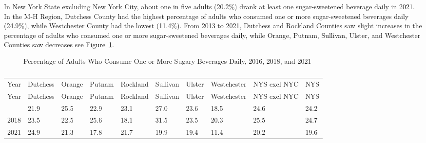 \documentclass[
  english,
  letterpaper,
]{report}
\begin{document}
In New York State excluding New York City, about one in five adults
(20.2\%) drank at least one sugar-sweetened beverage daily in 2021. In
the M-H Region, Dutchess County had the highest percentage of adults who
consumed one or more sugar-sweetened beverages daily (24.9\%), while
Westchester County had the lowest (11.4\%). From 2013 to 2021, Dutchess
and Rockland Counties saw slight increases in the percentage of adults
who consumed one or more sugar-sweetened beverages daily, while Orange,
Putnam, Sullivan, Ulster, and Westchester Counties saw decreases see
Figure~\ref{fig-brfss-sug-bev}.

\begin{figure}


\caption{\label{fig-brfss-sug-bev}Percentage of Adults Who Consume One
or More Sugary Beverages Daily, 2016, 2018, and 2021}

\end{figure}%

\begin{longtable}[]{@{}llllllllll@{}}

\caption{\label{tbl-brfss-adult-sug-bev}Percentage of Adults Who Consume
One or More Sugary Beverages Daily, 2016, 2018, and 2021}

\tabularnewline

\caption{}\label{T_bae69}\tabularnewline
\toprule\noalign{}
Year & Dutchess & Orange & Putnam & Rockland & Sullivan & Ulster &
Westchester & NYS excl NYC & NYS \\
\midrule\noalign{}
\endfirsthead
\toprule\noalign{}
Year & Dutchess & Orange & Putnam & Rockland & Sullivan & Ulster &
Westchester & NYS excl NYC & NYS \\
\midrule\noalign{}
\endhead
\bottomrule\noalign{}
\endlastfoot
2016 & 21.9 & 25.5 & 22.9 & 23.1 & 27.0 & 23.6 & 18.5 & 24.6 & 24.2 \\
2018 & 23.5 & 22.5 & 25.6 & 18.1 & 31.5 & 23.5 & 20.3 & 25.5 & 24.7 \\
2021 & 24.9 & 21.3 & 17.8 & 21.7 & 19.9 & 19.4 & 11.4 & 20.2 & 19.6 \\

\end{longtable}
\end{document}

